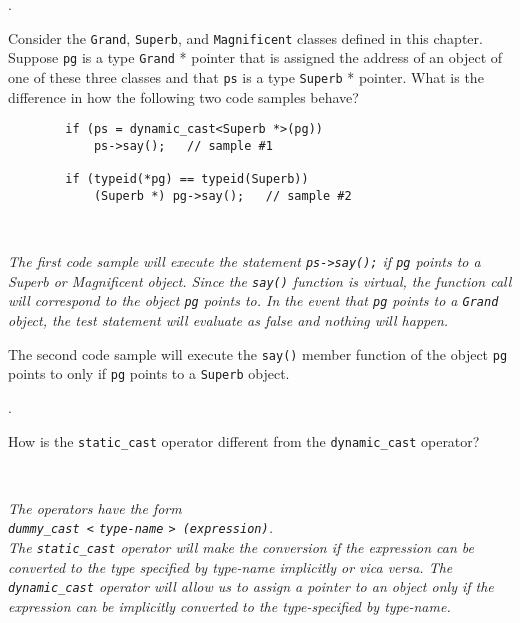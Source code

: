 \documentclass{amsart}
\begin{document}
. 
\begin{minipage}[t]{11.5 cm}
	Consider the \texttt{Grand}, \texttt{Superb}, and \texttt{Magnificent} classes defined in this chapter. Suppose \texttt{pg} is a type \texttt{Grand} * pointer that is assigned the address of an object of one of these three classes and that \texttt{ps} is a type \texttt{Superb} * pointer. What is the difference in how the following two code samples behave?
	\begin{verbatim}
		if (ps = dynamic_cast<Superb *>(pg))
		    ps->say();   // sample #1

		if (typeid(*pg) == typeid(Superb))
		    (Superb *) pg->say();   // sample #2
	\end{verbatim}
\end{minipage} \\[1ex]
\phantom{3. } 
\begin{minipage}[t]{11.5 cm}
	{\slshape 
		The first code sample will execute the statement
		\verb+ps->say();+ if \verb+pg+ points to a Superb or
		Magnificent object. 
		Since the \verb+say()+ function is virtual, the function
		call will correspond to the object \verb+pg+ points to.
		In the event that \verb+pg+ points to a \verb+Grand+ object,
		the test statement will evaluate as false and nothing
		will happen.

		The second code sample will execute the \verb+say()+ member
		function of the object \verb+pg+ points to only if 
		\verb+pg+ points to a \verb+Superb+ object. 
	}
\end{minipage} 
\vfill

. 
\begin{minipage}[t]{11.5 cm}
	How is the \verb+static_cast+ operator different from the \verb+dynamic_cast+ operator?
\end{minipage} \\[1ex]
\phantom{2. } 
\begin{minipage}[t]{11.5 cm}
	{\slshape 
		The operators have the form \\
		\verb+dummy_cast <+ \texttt{type-name}
		\verb+> (+\texttt{expression}\verb+)+. \\
		The \verb+static_cast+ operator will make the conversion if 
		the expression can be converted to the type specified by
		type-name implicitly or vica versa. 
		The \verb+dynamic_cast+ operator will allow us to assign a
		pointer to an object only if the expression can be implicitly
		converted to the type-specified by type-name.
	} 
\end{minipage} 
\vfill
\end{document}
